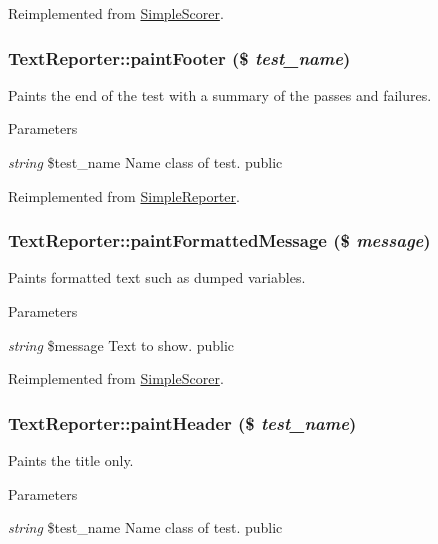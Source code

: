 Reimplemented from \hyperlink{class_simple_scorer_a25656682bd645cf156f3a2a87893d8b3}{SimpleScorer}.\hypertarget{class_text_reporter_af40b27732bf32f71ad4f2ebee6417667}{
\subsubsection[{paintFooter}]{\setlength{\rightskip}{0pt plus 5cm}TextReporter::paintFooter (\$ {\em test\_\-name})}}
\label{class_text_reporter_af40b27732bf32f71ad4f2ebee6417667}
Paints the end of the test with a summary of the passes and failures. 
\begin{DoxyParams}{Parameters}
\item[{\em string}]\$test\_\-name Name class of test.  public \end{DoxyParams}


Reimplemented from \hyperlink{class_simple_reporter_a447a6e823a5c17b1bd5f922a0b18fded}{SimpleReporter}.\hypertarget{class_text_reporter_ac308a6d3632656270578474b0b752b06}{
\subsubsection[{paintFormattedMessage}]{\setlength{\rightskip}{0pt plus 5cm}TextReporter::paintFormattedMessage (\$ {\em message})}}
\label{class_text_reporter_ac308a6d3632656270578474b0b752b06}
Paints formatted text such as dumped variables. 
\begin{DoxyParams}{Parameters}
\item[{\em string}]\$message Text to show.  public \end{DoxyParams}


Reimplemented from \hyperlink{class_simple_scorer_a19d5b72bd448cc22636569e20b64f607}{SimpleScorer}.\hypertarget{class_text_reporter_a0ad9d130d152c3fa6a56b65f599f34ca}{
\subsubsection[{paintHeader}]{\setlength{\rightskip}{0pt plus 5cm}TextReporter::paintHeader (\$ {\em test\_\-name})}}
\label{class_text_reporter_a0ad9d130d152c3fa6a56b65f599f34ca}
Paints the title only. 
\begin{DoxyParams}{Parameters}
\item[{\em string}]\$test\_\-name Name class of test.  public \end{DoxyParams}


